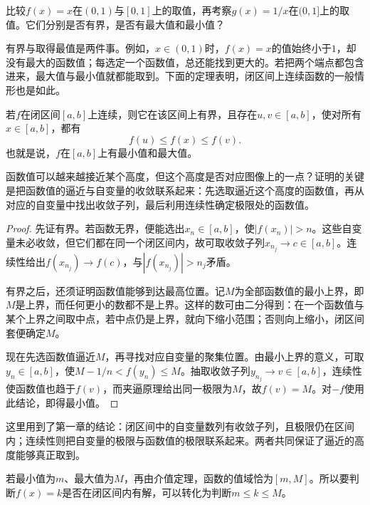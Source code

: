 \begin{example}
比较\(f(x)=x\)在\((0,1)\)与\([0,1]\)上的取值，再考察\(g(x)=1/x\)在\((0,1]\)上的取值。它们分别是否有界，是否有最大值和最小值？
\end{example}

有界与取得最值是两件事。例如，\(x\in(0,1)\)时，\(f(x)=x\)的值始终小于\(1\)，却没有最大的函数值；每选定一个函数值，总还能找到更大的。若把两个端点都包含进来，最大值与最小值就都能取到。下面的定理表明，闭区间上连续函数的一般情形也是如此。

\begin{theorem}[最值定理]\label{thm:functions-extreme-values}
若\(f\)在闭区间\([a,b]\)上连续，则它在该区间上有界，且存在\(u,v\in[a,b]\)，使对所有\(x\in[a,b]\)，都有
\begin{equation*}
 f(u)\le f(x)\le f(v).
\end{equation*}
也就是说，\(f\)在\([a,b]\)上有最小值和最大值。
\end{theorem}

函数值可以越来越接近某个高度，但这个高度是否对应图像上的一点？证明的关键是把函数值的逼近与自变量的收敛联系起来：先选取逼近这个高度的函数值，再从对应的自变量中找出收敛子列，最后利用连续性确定极限处的函数值。

\begin{proof}
先证有界。若函数无界，便能选出\(x_n\in[a,b]\)，使\(|f(x_n)|>n\)。这些自变量未必收敛，但它们都在同一个闭区间内，故可取收敛子列\(x_{n_j}\to c\in[a,b]\)。连续性给出\(f(x_{n_j})\to f(c)\)，与\(|f(x_{n_j})|>n_j\)矛盾。

有界之后，还须证明函数值能够到达最高位置。记\(M\)为全部函数值的最小上界，即\(M\)是上界，而任何更小的数都不是上界。这样的数可由二分得到：在一个函数值与某个上界之间取中点，若中点仍是上界，就向下缩小范围；否则向上缩小，闭区间套便确定\(M\)。

现在先选函数值逼近\(M\)，再寻找对应自变量的聚集位置。由最小上界的意义，可取\(y_n\in[a,b]\)，使\(M-1/n<f(y_n)\le M\)。抽取收敛子列\(y_{n_j}\to v\in[a,b]\)，连续性使函数值也趋于\(f(v)\)，而夹逼原理给出同一极限为\(M\)，故\(f(v)=M\)。对\(-f\)使用此结论，即得最小值。
\end{proof}

这里用到了第一章的结论：闭区间中的自变量数列有收敛子列，且极限仍在区间内；连续性则把自变量的极限与函数值的极限联系起来。两者共同保证了逼近的高度能够真正取到。

若最小值为\(m\)、最大值为\(M\)，再由介值定理，函数的值域恰为\([m,M]\)。所以要判断\(f(x)=k\)是否在闭区间内有解，可以转化为判断\(m\le k\le M\)。

